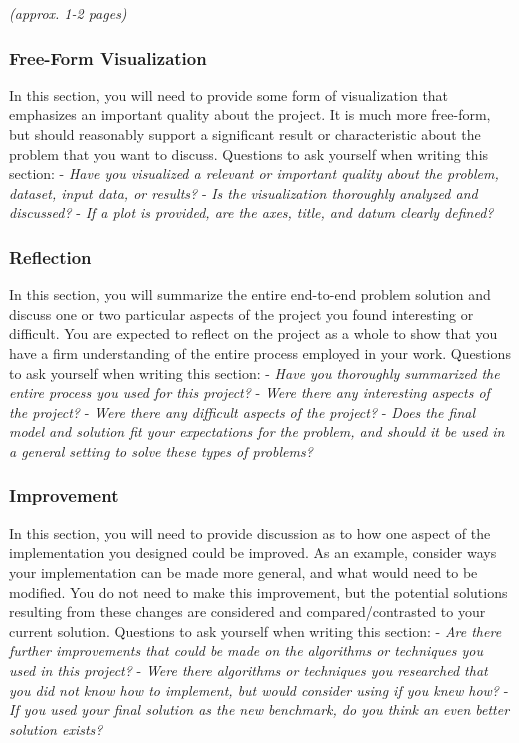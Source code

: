 \documentclass[]{article}
\begin{document}
\emph{(approx. 1-2 pages)}

\subsubsection{Free-Form Visualization}\label{free-form-visualization}

In this section, you will need to provide some form of visualization
that emphasizes an important quality about the project. It is much more free-form, but should reasonably support a significant result or characteristic about the problem that you want to discuss. Questions to ask yourself when writing this section: - \emph{Have you visualized a relevant or important quality about the problem, dataset, input data, or results?} - \emph{Is the visualization thoroughly analyzed and discussed?} - \emph{If a plot is provided, are the axes, title, and datum clearly defined?}

\subsubsection{Reflection}\label{reflection}

In this section, you will summarize the entire end-to-end problem
solution and discuss one or two particular aspects of the project you found interesting or difficult. You are expected to reflect on the project as a whole to show that you have a firm understanding of the entire process employed in your work. Questions to ask yourself when writing this section: - \emph{Have you thoroughly summarized the entire process you used for this project?} - \emph{Were there any interesting aspects of the project?} - \emph{Were there any difficult aspects of the project?} - \emph{Does the final model and solution fit your expectations for the problem, and should it be used in a general setting to solve these types of problems?}

\subsubsection{Improvement}\label{improvement}

In this section, you will need to provide discussion as to how one aspect of the implementation you designed could be improved. As an
example, consider ways your implementation can be made more general, and what would need to be modified. You do not need to make this improvement, but the potential solutions resulting from these changes are considered and compared/contrasted to your current solution.
Questions to ask yourself when writing this section: - \emph{Are there further improvements that could be made on the algorithms or techniques you used in this project?} - \emph{Were there algorithms or techniques you researched that you did not know how to implement, but would consider using if you knew how?} - \emph{If you used your final solution as the new benchmark, do you think an even better solution exists?}
\end{document}
